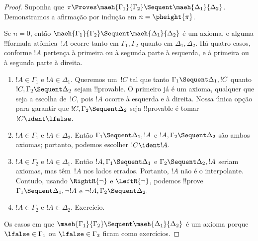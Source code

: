 \documentclass[../../../include/open-logic-section]{subfiles}
\begin{document}
\begin{proof}
  Suponha que $\pi \Proves \maeh{\Gamma_1}{\Gamma_2} \Sequent
  \maeh{\Delta_1}{\Delta_2}$. Demonstramos a afirmação por indução em
  $n=\pheight{\pi}$.

  Se $n=0$, então $\maeh{\Gamma_1}{\Gamma_2} \Sequent
  \maeh{\Delta_1}{\Delta_2}$ é um axioma, e alguma !!{formula}
  atômica~$!A$ ocorre tanto em $\Gamma_1, \Gamma_2$ quanto em $\Delta_1,
  \Delta_2$. Há quatro casos, conforme $!A$ pertença à primeira ou à
  segunda parte à esquerda, e à primeira ou à segunda parte à direita.
  \begin{enumerate}
    \item $!A \in \Gamma_1$ e $!A \in \Delta_1$. Queremos um~$!C$ tal
    que tanto $\Gamma_1 \Sequent \Delta_1, !C$ quanto $!C, \Gamma_2
    \Sequent \Delta_2$ sejam !!{provable}. O primeiro já é um axioma,
    qualquer que seja a escolha de~$!C$, pois $!A$ ocorre à esquerda e à
    direita. Nossa única opção para garantir que $!C, \Gamma_2 \Sequent
    \Delta_2$ seja !!{provable} é tomar $!C \ident \lfalse$.
    \item $!A \in \Gamma_1$ e $!A \in \Delta_2$. Então $\Gamma_1
    \Sequent \Delta_1, !A$ e $!A, \Gamma_2 \Sequent \Delta_2$ são ambos
    axiomas; portanto, podemos escolher $!C \ident !A$.
    \item $!A \in \Gamma_2$ e $!A \in \Delta_1$. Então $!A, \Gamma_1
    \Sequent \Delta_1$ e $\Gamma_2 \Sequent \Delta_2, !A$ seriam
    axiomas, mas têm~$!A$ nos lados errados. Portanto, $!A$ não é o
    interpolante. Contudo, usando $\RightR{\lnot}$ e $\LeftR{\lnot}$,
    podemos !!{prove} $\Gamma_1 \Sequent \Delta_1, \lnot!A$ e $\lnot
    !A, \Gamma_2 \Sequent \Delta_2$.
    \item $!A \in \Gamma_2$ e $!A \in \Delta_2$. Exercício.
  \end{enumerate}
  Os casos em que $\maeh{\Gamma_1}{\Gamma_2} \Sequent
  \maeh{\Delta_1}{\Delta_2}$ é um axioma porque $\lfalse \in \Gamma_1$
  ou $\lfalse \in \Gamma_2$ ficam como exercícios.


\end{proof}
\end{document}
